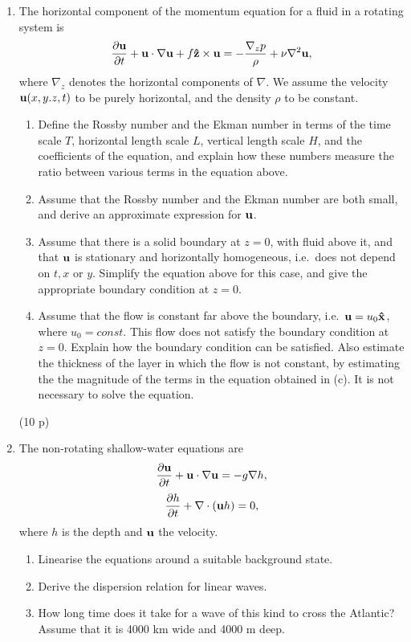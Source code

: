 \documentclass[12pt,a4paper]{article}
\newcommand{\bu}{{\bf u}}
\newcommand{\hx}{{\bf\hat{x}}}
\newcommand{\hz}{{\bf\hat{z}}}
\begin{document}
\begin{enumerate}
\item 
The horizontal component of the momentum equation for a fluid in a rotating
system is
$$
\frac{\partial\bu}{\partial t}+\bu\cdot\nabla\bu+f\hz\times\bu =
-\frac{\nabla_z p}{\rho}+\nu\nabla^2 \bu,
$$
where $\nabla_z$ denotes the horizontal components of $\nabla$. We assume the velocity $\bu(x,y.z,t)$ to be purely horizontal, and the density $\rho$ to be constant.
\begin{enumerate}
  \item Define the Rossby number and the Ekman number in terms of the time
  scale $T$, horizontal length scale $L$, vertical length scale $H$, and the
  coefficients of the equation, and explain how these numbers measure the ratio between
  various terms in the equation above.
  \item Assume that the Rossby number and the Ekman number are both small, and derive
  an approximate expression for $\bu$.
  \item Assume that there is a solid boundary at $z=0$, with fluid above it, and that $\bu$ is
  stationary and horizontally homogeneous, i.e.\ does not depend on $t, x$ or $y$. Simplify
  the equation above for this case, and give the appropriate boundary condition at $z=0$.
  \item Assume that the flow is constant far above the boundary, i.e.\ $\bu=u_0\hx $,
  where $u_0=const.$ This flow does not satisfy the boundary condition at $z=0$. 
  Explain how the boundary condition can be satisfied. Also estimate the thickness of the
  layer in which the flow is not constant, by estimating the the magnitude of the terms in the
  equation obtained in (c). It is not necessary to solve the equation.
 \end{enumerate}

(10 p) \\
\item
The non-rotating shallow-water equations are
$$
\frac{\partial \bu}{\partial t}+\bu\cdot\nabla\bu = -g\nabla h,
$$
$$
\frac{\partial h}{\partial t}+\nabla\cdot(\bu h) = 0,
$$
where $h$ is the depth and $\bu$ the velocity.
\begin{enumerate}
  \item Linearise the equations around a suitable background state.
  \item Derive the dispersion relation for linear waves.
  \item How long time does it take for a wave of this kind to cross the Atlantic? Assume
  that it is 4000 km wide and 4000 m deep.
\end{enumerate}


\end{enumerate}
\end{document}
